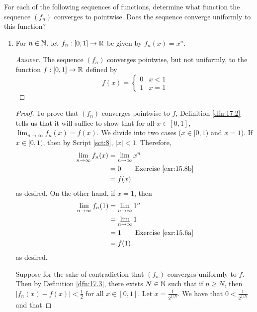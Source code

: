 \documentclass[../main.tex]{subfiles}
\begin{document}
\begin{exercise}\label{exr:17.5}
    For each of the following sequences of functions, determine what function the sequence $(f_n)$ converges to pointwise. Does the sequence converge uniformly to this function?
    \begin{enumerate}[label={(\alph*)}]
        \item For $n\in\mathbb{N}$, let $f_n:[0,1]\to\mathbb{R}$ be given by $f_n(x)=x^n$.
        \begin{proof}[Answer]
            The sequence $(f_n)$ converges pointwise, but not uniformly, to the function $f:[0,1]\to\mathbb{R}$ defined by
            \begin{equation*}
                f(x) =
                \begin{cases}
                    0 & x<1\\
                    1 & x=1
                \end{cases}
            \end{equation*}
        \end{proof}
        \begin{proof}
            To prove that $(f_n)$ converges pointwise to $f$, Definition \ref{dfn:17.2} tells us that it will suffice to show that for all $x\in[0,1]$, $\lim_{n\to\infty}f_n(x)=f(x)$. We divide into two cases ($x\in[0,1)$ and $x=1$). If $x\in[0,1)$, then by Script \ref{sct:8}, $|x|<1$. Therefore,
            \begin{align*}
                \lim_{n\to\infty}f_n(x) &= \lim_{n\to\infty}x^n\\
                &= 0\tag*{Exercise \ref{exr:15.8b}}\\
                &= f(x)
            \end{align*}
            as desired. On the other hand, if $x=1$, then
            \begin{align*}
                \lim_{n\to\infty}f_n(1) &= \lim_{n\to\infty}1^n\\
                &= \lim_{n\to\infty}1\\
                &= 1\tag*{Exercise \ref{exr:15.6a}}\\
                &= f(1)
            \end{align*}
            as desired.\par
            Suppose for the sake of contradiction that $(f_n)$ converges uniformly to $f$. Then by Definition \ref{dfn:17.3}, there exists $N\in\mathbb{N}$ such that if $n\geq N$, then $|f_n(x)-f(x)|<\frac{1}{2}$ for all $x\in[0,1]$. Let $x=\frac{1}{2^{1/N}}$. We have that $0<\frac{1}{2^{1/N}}$ and that

\end{proof}
\end{enumerate}
\end{exercise}
\end{document}
